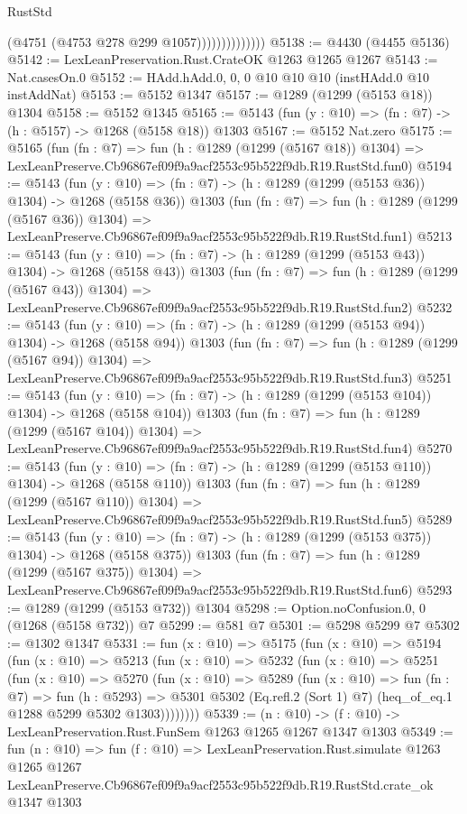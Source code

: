 \begin{lexlean}{RustStd}
\begin{coremodule}
                            (@4751 (@4753 @278 @299 @1057))))))))))))))
@5138 := @4430 (@4455 @5136)
@5142 := LexLeanPreservation.Rust.CrateOK @1263 @1265 @1267
@5143 := Nat.casesOn.{0}
@5152 := HAdd.hAdd.{0, 0, 0} @10 @10 @10 (instHAdd.{0} @10 instAddNat)
@5153 := @5152 @1347
@5157 := @1289 (@1299 (@5153 @18)) @1304
@5158 := @5152 @1345
@5165 := @5143 (fun (y : @10) => (fn : @7) -> (h : @5157) -> @1268 (@5158 @18)) @1303
@5167 := @5152 Nat.zero
@5175 := @5165
    (fun (fn : @7) =>
    fun (h : @1289 (@1299 (@5167 @18)) @1304) =>
    LexLeanPreserve.Cb96867ef09f9a9acf2553c95b522f9db.R19.RustStd.fun0)
@5194 := @5143
    (fun (y : @10) => (fn : @7) -> (h : @1289 (@1299 (@5153 @36)) @1304) -> @1268 (@5158 @36))
    @1303
    (fun (fn : @7) =>
    fun (h : @1289 (@1299 (@5167 @36)) @1304) =>
    LexLeanPreserve.Cb96867ef09f9a9acf2553c95b522f9db.R19.RustStd.fun1)
@5213 := @5143
    (fun (y : @10) => (fn : @7) -> (h : @1289 (@1299 (@5153 @43)) @1304) -> @1268 (@5158 @43))
    @1303
    (fun (fn : @7) =>
    fun (h : @1289 (@1299 (@5167 @43)) @1304) =>
    LexLeanPreserve.Cb96867ef09f9a9acf2553c95b522f9db.R19.RustStd.fun2)
@5232 := @5143
    (fun (y : @10) => (fn : @7) -> (h : @1289 (@1299 (@5153 @94)) @1304) -> @1268 (@5158 @94))
    @1303
    (fun (fn : @7) =>
    fun (h : @1289 (@1299 (@5167 @94)) @1304) =>
    LexLeanPreserve.Cb96867ef09f9a9acf2553c95b522f9db.R19.RustStd.fun3)
@5251 := @5143
    (fun (y : @10) => (fn : @7) -> (h : @1289 (@1299 (@5153 @104)) @1304) -> @1268 (@5158 @104))
    @1303
    (fun (fn : @7) =>
    fun (h : @1289 (@1299 (@5167 @104)) @1304) =>
    LexLeanPreserve.Cb96867ef09f9a9acf2553c95b522f9db.R19.RustStd.fun4)
@5270 := @5143
    (fun (y : @10) => (fn : @7) -> (h : @1289 (@1299 (@5153 @110)) @1304) -> @1268 (@5158 @110))
    @1303
    (fun (fn : @7) =>
    fun (h : @1289 (@1299 (@5167 @110)) @1304) =>
    LexLeanPreserve.Cb96867ef09f9a9acf2553c95b522f9db.R19.RustStd.fun5)
@5289 := @5143
    (fun (y : @10) => (fn : @7) -> (h : @1289 (@1299 (@5153 @375)) @1304) -> @1268 (@5158 @375))
    @1303
    (fun (fn : @7) =>
    fun (h : @1289 (@1299 (@5167 @375)) @1304) =>
    LexLeanPreserve.Cb96867ef09f9a9acf2553c95b522f9db.R19.RustStd.fun6)
@5293 := @1289 (@1299 (@5153 @732)) @1304
@5298 := Option.noConfusion.{0, 0} (@1268 (@5158 @732)) @7
@5299 := @581 @7
@5301 := @5298 @5299 @7
@5302 := @1302 @1347
@5331 := fun (x : @10) =>
  @5175
    (fun (x : @10) =>
    @5194
      (fun (x : @10) =>
      @5213
        (fun (x : @10) =>
        @5232
          (fun (x : @10) =>
          @5251
            (fun (x : @10) =>
            @5270
              (fun (x : @10) =>
              @5289
                (fun (x : @10) =>
                fun (fn : @7) =>
                fun (h : @5293) =>
                @5301 @5302 (Eq.refl.{2} (Sort 1) @7) (heq_of_eq.{1} @1288 @5299 @5302 @1303))))))))
@5339 := (n : @10) -> (f : @10) -> LexLeanPreservation.Rust.FunSem @1263 @1265 @1267 @1347 @1303
@5349 := fun (n : @10) =>
  fun (f : @10) =>
  LexLeanPreservation.Rust.simulate
    @1263
    @1265
    @1267
    LexLeanPreserve.Cb96867ef09f9a9acf2553c95b522f9db.R19.RustStd.crate_ok
    @1347
    @1303
\end{coremodule}
\end{lexlean}
